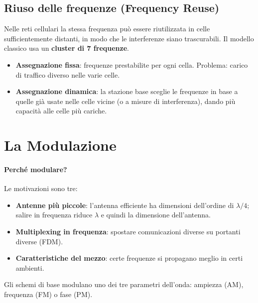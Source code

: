 \subsection{Riuso delle frequenze (Frequency Reuse)}
Nelle reti cellulari la stessa frequenza può essere riutilizzata in celle sufficientemente distanti, in modo che le interferenze siano trascurabili. Il modello classico usa un \textbf{cluster di 7 frequenze}.
\begin{itemize}
    \item \textbf{Assegnazione fissa}: frequenze prestabilite per ogni cella. Problema: carico di traffico diverso nelle varie celle.
    \item \textbf{Assegnazione dinamica}: la stazione base sceglie le frequenze in base a quelle già usate nelle celle vicine (o a misure di interferenza), dando più capacità alle celle più cariche.
\end{itemize}

\section{La Modulazione}

\paragraph{Perché modulare?} Le motivazioni sono tre:
\begin{itemize}
    \item \textbf{Antenne più piccole}: l'antenna efficiente ha dimensioni dell'ordine di $\lambda/4$; salire in frequenza riduce $\lambda$ e quindi la dimensione dell'antenna.
    \item \textbf{Multiplexing in frequenza}: spostare comunicazioni diverse su portanti diverse (FDM).
    \item \textbf{Caratteristiche del mezzo}: certe frequenze si propagano meglio in certi ambienti.
\end{itemize}

Gli schemi di base modulano uno dei tre parametri dell'onda: ampiezza (AM), frequenza (FM) o fase (PM).


